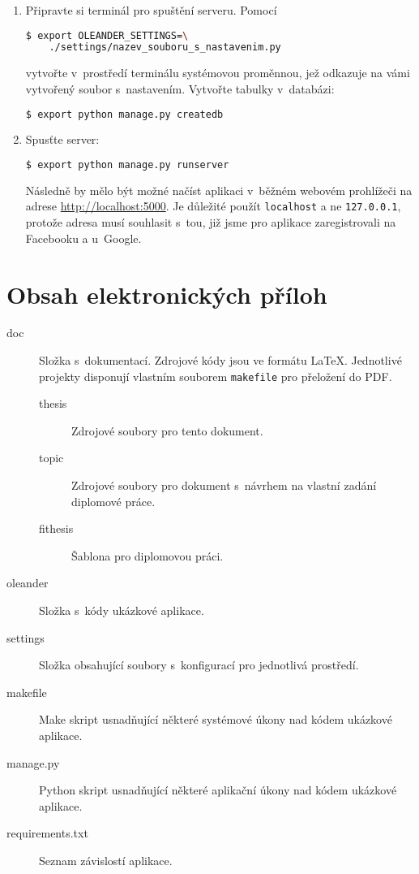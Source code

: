 \documentclass[12pt,oneside,final]{fithesis2}
\begin{document}
\begin{enumerate}
    \item Připravte si terminál pro spuštění serveru. Pomocí

        \begin{lstlisting}[language=bash]
$ export OLEANDER_SETTINGS=\
    ./settings/nazev_souboru_s_nastavenim.py
        \end{lstlisting}

        vytvořte v~prostředí terminálu systémovou proměnnou, jež odkazuje na vá\-mi vy\-tvo\-ře\-ný soubor s~nastavením. Vytvořte tabulky v~databázi:

        \begin{lstlisting}[language=bash]
$ export python manage.py createdb
        \end{lstlisting}

    \item Spusťte server:

    \begin{lstlisting}[language=bash]
$ export python manage.py runserver
    \end{lstlisting}

    Následně by mělo být možné načíst aplikaci v~běžném webovém prohlížeči na adrese \url{http://localhost:5000}. Je důležité použít {\tt localhost} a ne {\tt 127.0.0.1}, protože adresa musí souhlasit s~tou, již jsme pro aplikace zaregistrovali na Facebooku a u~Google.
\end{enumerate}



\chapter{Obsah elektronických příloh}

\begin{description}
    \item[doc] Složka s~dokumentací. Zdrojové kódy jsou ve formátu \LaTeX. Jednotlivé projekty disponují vlastním souborem {\tt makefile} pro přeložení do PDF.
        \begin{description}
            \item[thesis] Zdrojové soubory pro tento dokument.
            \item[topic] Zdrojové soubory pro dokument s~návrhem na vlastní zadání diplomové práce.
            \item[fithesis] Šablona pro diplomovou práci.
        \end{description}

    \item[oleander] Složka s~kódy ukázkové aplikace.
    \item[settings] Složka obsahující soubory s~konfigurací pro jednotlivá prostředí.
    \item[makefile] Make skript usnadňující některé systémové úkony nad kódem ukázkové aplikace.
    \item[manage.py] Python skript usnadňující některé aplikační úkony nad kódem ukázkové aplikace.
    \item[requirements.txt] Seznam závislostí aplikace.
\end{description}
\end{document}
